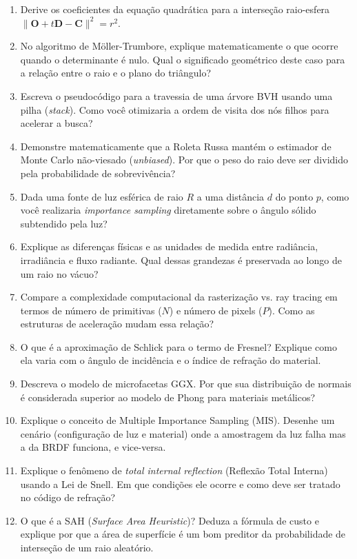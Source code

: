 \begin{enumerate}
    \item Derive os coeficientes da equação quadrática para a interseção raio-esfera $\|\mathbf{O} + t\mathbf{D} - \mathbf{C}\|^2 = r^2$.
    \item No algoritmo de Möller-Trumbore, explique matematicamente o que ocorre quando o determinante é nulo. Qual o significado geométrico deste caso para a relação entre o raio e o plano do triângulo?
    \item Escreva o pseudocódigo para a travessia de uma árvore BVH usando uma pilha (\textit{stack}). Como você otimizaria a ordem de visita dos nós filhos para acelerar a busca?
    \item Demonstre matematicamente que a Roleta Russa mantém o estimador de Monte Carlo não-viesado (\textit{unbiased}). Por que o peso do raio deve ser dividido pela probabilidade de sobrevivência?
    \item Dada uma fonte de luz esférica de raio $R$ a uma distância $d$ do ponto $p$, como você realizaria \textit{importance sampling} diretamente sobre o ângulo sólido subtendido pela luz?
    \item Explique as diferenças físicas e as unidades de medida entre radiância, irradiância e fluxo radiante. Qual dessas grandezas é preservada ao longo de um raio no vácuo?
    \item Compare a complexidade computacional da rasterização vs. ray tracing em termos de número de primitivas ($N$) e número de pixels ($P$). Como as estruturas de aceleração mudam essa relação?
    \item O que é a aproximação de Schlick para o termo de Fresnel? Explique como ela varia com o ângulo de incidência e o índice de refração do material.
    \item Descreva o modelo de microfacetas GGX. Por que sua distribuição de normais é considerada superior ao modelo de Phong para materiais metálicos?
    \item Explique o conceito de Multiple Importance Sampling (MIS). Desenhe um cenário (configuração de luz e material) onde a amostragem da luz falha mas a da BRDF funciona, e vice-versa.
    \item Explique o fenômeno de \textit{total internal reflection} (Reflexão Total Interna) usando a Lei de Snell. Em que condições ele ocorre e como deve ser tratado no código de refração?
    \item O que é a SAH (\textit{Surface Area Heuristic})? Deduza a fórmula de custo e explique por que a área de superfície é um bom preditor da probabilidade de interseção de um raio aleatório.
\end{enumerate}




